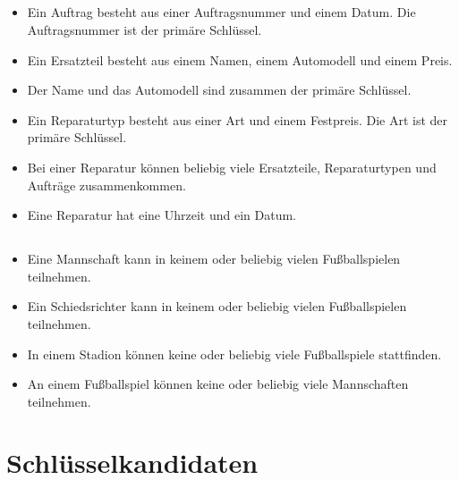 \documentclass[ngerman]{gdb-aufgabenblatt}
\begin{document}
	\subsection{} %
		\begin{itemize}
			\item	Ein Auftrag besteht aus einer Auftragsnummer und einem Datum. Die Auftragsnummer ist der primäre Schlüssel.
			\item	Ein Ersatzteil besteht aus einem Namen, einem Automodell und einem Preis.
			\item	Der Name und das Automodell sind zusammen der primäre Schlüssel.
			\item	Ein Reparaturtyp besteht aus einer Art und einem Festpreis. Die Art ist der primäre Schlüssel.
			\item	Bei einer Reparatur können beliebig viele Ersatzteile, Reparaturtypen und Aufträge zusammenkommen.
			\item	Eine Reparatur hat eine Uhrzeit und ein Datum.
		\end{itemize}
	\subsection{} %
		\begin{itemize}
			\item	Eine Mannschaft kann in keinem oder beliebig vielen Fußballspielen teilnehmen.
			\item	Ein Schiedsrichter kann in keinem oder beliebig vielen Fußballspielen teilnehmen.
			\item	In einem Stadion können keine oder beliebig viele Fußballspiele stattfinden.
			\item	An einem Fußballspiel können keine oder beliebig viele Mannschaften teilnehmen.
		\end{itemize}
\section{Schlüsselkandidaten}
	\subsection{} %
	\subsection{} %
\end{document}
